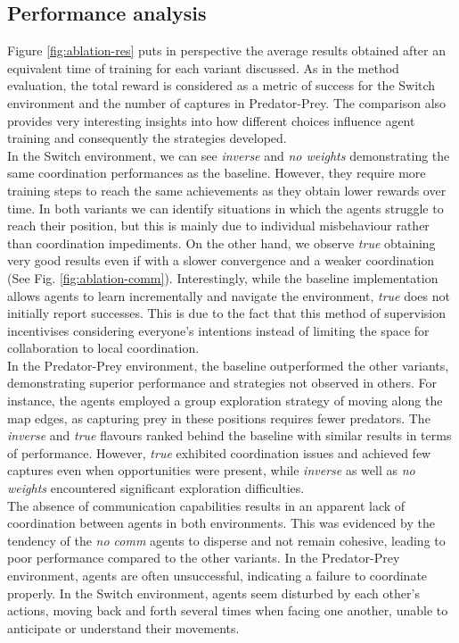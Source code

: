 \documentclass[a4paper,singleside,12pt]{report} %
\begin{document}
\subsection{Performance analysis}\label{res-analysis}
Figure \ref{fig:ablation-res} puts in perspective the average results obtained after an equivalent time of training for each variant discussed. As in the method evaluation, the total reward is considered as a metric of success for the Switch environment and the number of captures in Predator-Prey. The comparison also provides very interesting insights into how different choices influence agent training and consequently the strategies developed.\\
In the Switch environment, we can see \textit{inverse} and \textit{no weights} demonstrating the same coordination performances as the baseline. However, they require more training steps to reach the same achievements as they obtain lower rewards over time. In both variants we can identify situations in which the agents struggle to reach their position, but this is mainly due to individual misbehaviour rather than coordination impediments. On the other hand, we observe \textit{true} obtaining very good results even if with a slower convergence and a weaker coordination (See Fig. \ref{fig:ablation-comm}). Interestingly, while the baseline implementation allows agents to learn incrementally and navigate the environment, \textit{true} does not initially report successes. This is due to the fact that this method of supervision incentivises considering everyone's intentions instead of limiting the space for collaboration to local coordination.\\
In the Predator-Prey environment, the baseline outperformed the other variants, demonstrating superior performance and strategies not observed in others. For instance, the agents employed a group exploration strategy of moving along the map edges, as capturing prey in these positions requires fewer predators. The \textit{inverse} and \textit{true} flavours ranked behind the baseline with similar results in terms of performance. However, \textit{true} exhibited coordination issues and achieved few captures even when opportunities were present, while \textit{inverse} as well as \textit{no weights} encountered significant exploration difficulties.\\
The absence of communication capabilities results in an apparent lack of coordination between agents in both environments. This was evidenced by the tendency of the \textit{no comm} agents to disperse and not remain cohesive, leading to poor performance compared to the other variants. In the Predator-Prey environment, agents are often unsuccessful, indicating a failure to coordinate properly. In the Switch environment, agents seem disturbed by each other's actions, moving back and forth several times when facing one another, unable to anticipate or understand their movements.\\
\end{document}
